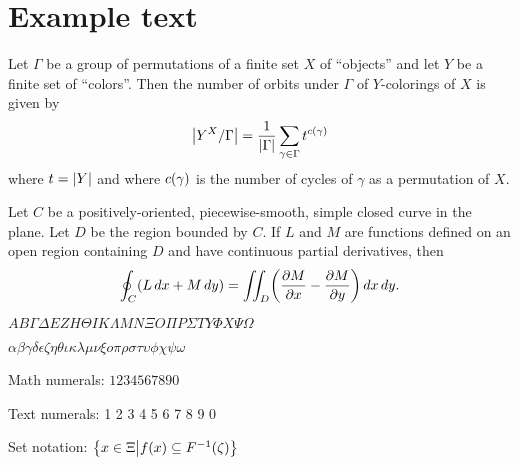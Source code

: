 \section*{Example text}

\begin{theorem*}
  Let $\Gamma$ be a group of permutations of a finite set $X$ of ``objects'' and let $Y$ be a finite set of ``colors''.
  Then the number of orbits under $\Gamma$ of $Y$-colorings of $X$ is given by
  \begin{equation*}
    \abs*{Y^{X} / \Gamma} = \frac{1}{\abs{\Gamma}} \sum_{\gamma \in \Gamma} t^{c \pbrac{\gamma}}
  \end{equation*}
  where $t = \abs{Y}$ and where $c \pbrac{\gamma}$ is the number of cycles of $\gamma$ as a permutation of $X$.
\end{theorem*}

\begin{theorem*}
  Let $C$ be a positively-oriented, piecewise-smooth, simple closed curve in the plane.
  Let $D$ be the region bounded by $C$.
  If $L$ and $M$ are functions defined on an open region containing $D$ and have continuous partial derivatives, then
  \begin{equation*}
    \oint_{C} \pbrac*{L \, d x + M \, d y} = \iint_{D} \pbrac*{\frac{\partial M}{\partial x} - \frac{\partial M}{\partial y}} \, dx \, d y.
  \end{equation*}
\end{theorem*}

$A B \Gamma \Delta E Z H \Theta I K \Lambda M N \Xi O \Pi P \Sigma T Y \Phi X \Psi \Omega$

$\alpha \beta \gamma \delta \epsilon \zeta \eta \theta \iota \kappa \lambda \mu \nu \xi o \pi \rho \sigma \tau \upsilon \phi \chi \psi \omega$

Math numerals:
$1 2 3 4 5 6 7 8 9 0$

Text numerals:
1 2 3 4 5 6 7 8 9 0

Set notation: $\cbrac*{x \in \Xi \middle\vert f(x) \subseteq F^{-1} (\zeta)}$